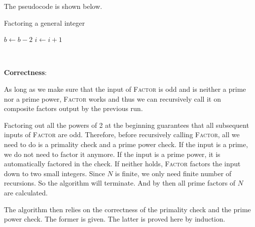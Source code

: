 \documentclass{article}
\begin{document}
The pseudocode is shown below.
\begin{algorithm}
\caption{Factoring a general integer}
\begin{algorithmic}[1]
	\EndIf
	 
	\EndIf
	 {$b\gets b-2$}
	\Else{} {$i\gets i+1$}
	\EndIf
\EndWhile
{}
\EndProcedure
{}
\EndIf
{}
\Else{}
\EndIf
{}
\EndProcedure
{}
\EndIf
{}
\EndProcedure
\end{algorithmic}
\end{algorithm}

~

\noindent\textbf{Correctness}:

As long as we make sure that the input of \textsc{Factor} is odd and is neither a prime nor a prime power, \textsc{Factor} works and thus we can recursively call it on composite factors output by the previous run.

Factoring out all the powers of 2 at the beginning guarantees that all subsequent inputs of \textsc{Factor} are odd. Therefore, before recursively calling \textsc{Factor}, all we need to do is a primality check and a prime power check. If the input is a prime, we do not need to factor it anymore. If the input is a prime power, it is automatically factored in the check. If neither holds, \textsc{Factor} factors the input down to two small integers. Since $N$ is finite, we only need finite number of recursions. So the algorithm will terminate. And by then all prime factors of $N$ are calculated.

The algorithm then relies on the correctness of the primality check and the prime power check. The former is given. The latter is proved here by induction.
\end{document}
